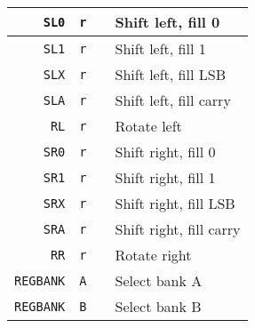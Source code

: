 \begin{table}[H]
\begin{tabular}{| r | c | c | l |}
\verb|SL0|&\verb|r|&\verb||& Shift left, fill 0 \\ \hline
\verb|SL1|&\verb|r|&\verb||& Shift left, fill 1 \\ \hline
\verb|SLX|&\verb|r|&\verb||& Shift left, fill LSB \\ \hline
\verb|SLA|&\verb|r|&\verb||& Shift left, fill carry \\ \hline
\verb|RL|&\verb|r|&\verb||& Rotate left \\ \hline
\verb|SR0|&\verb|r|&\verb||& Shift right, fill 0 \\ \hline
\verb|SR1|&\verb|r|&\verb||& Shift right, fill 1 \\ \hline
\verb|SRX|&\verb|r|&\verb||& Shift right, fill LSB \\ \hline
\verb|SRA|&\verb|r|&\verb||& Shift right, fill carry \\ \hline
\verb|RR|&\verb|r|&\verb||& Rotate right \\ \hline

\verb|REGBANK|&\verb|A|&\verb||& Select bank A \\ \hline
\verb|REGBANK|&\verb|B|&\verb||& Select bank B \\ \hline
\end{tabular}
\end{table}

